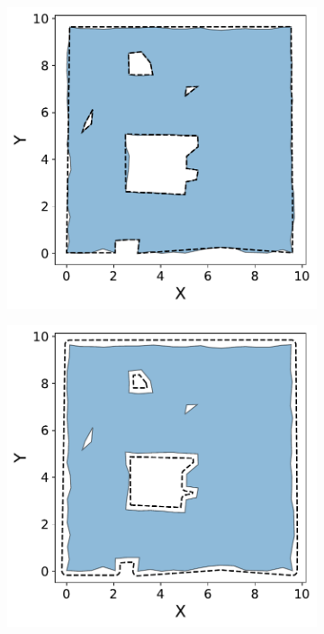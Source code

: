 \begin{figure}[H]
  \begin{subfigure}[t]{.30\linewidth}
    \centering\includegraphics[clip,trim=0cm 0cm 0cm 0cm, width=.99\linewidth]{chapter_3_polylidar3d/imgs/polygon/PolygonExtraction_c.pdf}
    \caption{\label{fig:ch3_polygon_post_a}}
  \end{subfigure}
  \hfill
  \begin{subfigure}[t]{.30\linewidth}
    \centering\includegraphics[clip,trim=0cm 0cm 0cm 0cm,width=.99\linewidth]{chapter_3_polylidar3d/imgs/polygon/PolygonExtraction_d.pdf}

\end{subfigure}
\end{figure}
